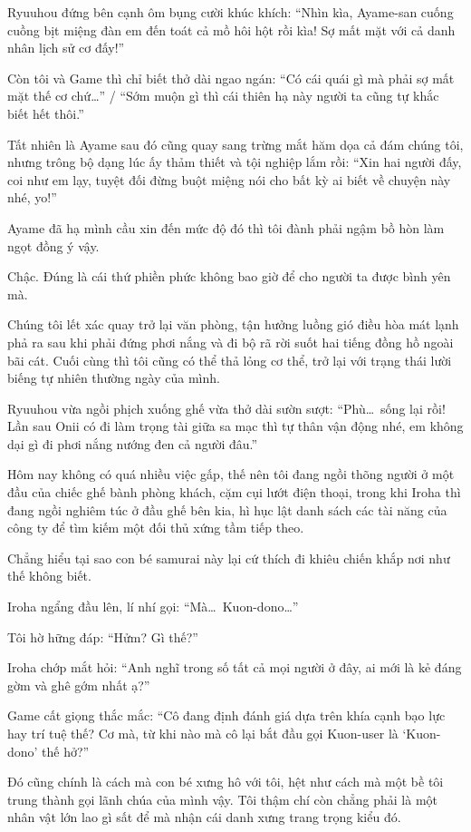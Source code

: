 \documentclass[../main.tex]{subfiles}
\begin{document}
Ryuuhou đứng bên cạnh ôm bụng cười khúc khích: ``Nhìn kìa, Ayame-san cuống cuồng bịt miệng đàn em đến toát cả mồ hôi hột rồi kìa! Sợ mất mặt với cả danh nhân lịch sử cơ đấy!''

Còn tôi và Game thì chỉ biết thở dài ngao ngán: ``Có cái quái gì mà phải sợ mất mặt thế cơ chứ\dots'' / ``Sớm muộn gì thì cái thiên hạ này người ta cũng tự khắc biết hết thôi.''

Tất nhiên là Ayame sau đó cũng quay sang trừng mắt hăm dọa cả đám chúng tôi, nhưng trông bộ dạng lúc ấy thảm thiết và tội nghiệp lắm rồi: ``Xin hai người đấy, coi như em lạy, tuyệt đối đừng buột miệng nói cho bất kỳ ai biết về chuyện này nhé, yo!''

Ayame đã hạ mình cầu xin đến mức độ đó thì tôi đành phải ngậm bồ hòn làm ngọt đồng ý vậy.

Chậc. Đúng là cái thứ phiền phức không bao giờ để cho người ta được bình yên mà.

\ct

Chúng tôi lết xác quay trở lại văn phòng, tận hưởng luồng gió điều hòa mát lạnh phả ra sau khi phải đứng phơi nắng và đi bộ rã rời suốt hai tiếng đồng hồ ngoài bãi cát. Cuối cùng thì tôi cũng có thể thả lỏng cơ thể, trở lại với trạng thái lười biếng tự nhiên thường ngày của mình.

Ryuuhou vừa ngồi phịch xuống ghế vừa thở dài sườn sượt: ``Phù\dots\ sống lại rồi! Lần sau Onii có đi làm trọng tài giữa sa mạc thì tự thân vận động nhé, em không dại gì đi phơi nắng nướng đen cả người đâu.''

Hôm nay không có quá nhiều việc gấp, thế nên tôi đang ngồi thõng người ở một đầu của chiếc ghế bành phòng khách, cặm cụi lướt điện thoại, trong khi Iroha thì đang ngồi nghiêm túc ở đầu ghế bên kia, hì hục lật danh sách các tài năng của công ty để tìm kiếm một đối thủ xứng tầm tiếp theo.

Chẳng hiểu tại sao con bé samurai này lại cứ thích đi khiêu chiến khắp nơi như thế không biết.

Iroha ngẩng đầu lên, lí nhí gọi: ``Mà\dots\ Kuon-dono\dots''

Tôi hờ hững đáp: ``Hửm? Gì thế?''

Iroha chớp mắt hỏi: ``Anh nghĩ trong số tất cả mọi người ở đây, ai mới là kẻ đáng gờm và ghê gớm nhất ạ?''

Game cất giọng thắc mắc: ``Cô đang định đánh giá dựa trên khía cạnh bạo lực hay trí tuệ thế? Cơ mà, từ khi nào mà cô lại bắt đầu gọi Kuon-user là `Kuon-dono' thế hở?''

Đó cũng chính là cách mà con bé xưng hô với tôi, hệt như cách mà một bề tôi trung thành gọi lãnh chúa của mình vậy. Tôi thậm chí còn chẳng phải là một nhân vật lớn lao gì sất để mà nhận cái danh xưng trang trọng kiểu đó.
\end{document}
